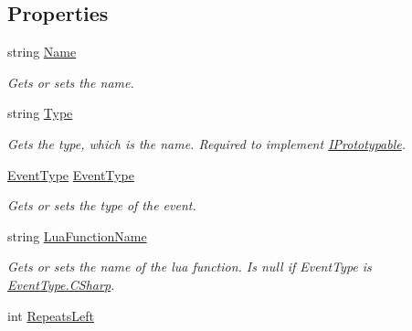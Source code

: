 \subsection*{Properties}
\begin{DoxyCompactItemize}
\item 
string \hyperlink{class_scheduler_1_1_scheduled_event_aa7173affda869088f36087fe308aa21f}{Name}
\begin{DoxyCompactList}\small\item\em Gets or sets the name. \end{DoxyCompactList}\item 
string \hyperlink{class_scheduler_1_1_scheduled_event_a5a98cd2dcf9a67d898bed91d7e65eedf}{Type}
\begin{DoxyCompactList}\small\item\em Gets the type, which is the name. Required to implement \hyperlink{interface_i_prototypable}{I\+Prototypable}. \end{DoxyCompactList}\item 
\hyperlink{namespace_scheduler_a85a4e27de37756a9765a49f3b3e4ba81}{Event\+Type} \hyperlink{class_scheduler_1_1_scheduled_event_ae2c9cdd783bf0874e5d2e8758dab70ba}{Event\+Type}
\begin{DoxyCompactList}\small\item\em Gets or sets the type of the event. \end{DoxyCompactList}\item 
string \hyperlink{class_scheduler_1_1_scheduled_event_a9d7fd8c8658907874ed2e18311e46d38}{Lua\+Function\+Name}
\begin{DoxyCompactList}\small\item\em Gets or sets the name of the lua function. Is null if Event\+Type is \hyperlink{namespace_scheduler_a85a4e27de37756a9765a49f3b3e4ba81a83925001a044cdfe0c64e9a44345b66d}{Event\+Type.\+C\+Sharp}. \end{DoxyCompactList}\item 
int \hyperlink{class_scheduler_1_1_scheduled_event_aef67aa8b357363a78a4dd88e228c7bd7}{Repeats\+Left}

\end{DoxyCompactItemize}
